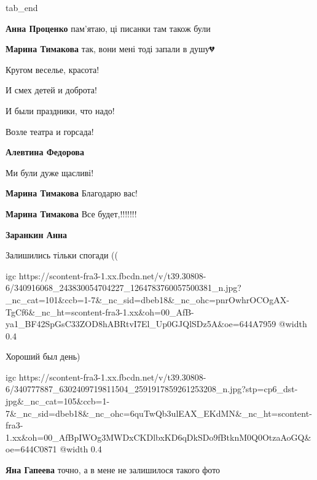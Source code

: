   tab_end
\fi

\begin{itemize} %
\textbf{Анна Проценко} пам'ятаю, ці писанки там також були

\textbf{Марина Тимакова} так, вони мені тоді запали в душу💔
\end{itemize} %


Кругом веселье, красота!

И смех детей и доброта!

И были праздники, что надо!

Возле театра и горсада!

\begin{itemize} %
\textbf{Алевтина Федорова}

Ми були дуже щасливі!

\textbf{Марина Тимакова} Благодарю вас!

\textbf{Марина Тимакова} Все будет,!!!!!!!

\textbf{Заранкин Анна} 🙏🏻
\end{itemize} %


Залишились тільки спогади ((

\ifcmt
  igc https://scontent-fra3-1.xx.fbcdn.net/v/t39.30808-6/340916068_243830054704227_1264783760057500381_n.jpg?_nc_cat=101&ccb=1-7&_nc_sid=dbeb18&_nc_ohc=pnrOwhrOCOgAX-TgCf6&_nc_ht=scontent-fra3-1.xx&oh=00_AfB-ya1_BF42SpGsC33ZOD8hABRtvI7El_Up0GJQlSDz5A&oe=644A7959
	@width 0.4
\fi


Хороший был день)


\ifcmt
  igc https://scontent-fra3-1.xx.fbcdn.net/v/t39.30808-6/340777887_6302409719811504_2591917859261253208_n.jpg?stp=cp6_dst-jpg&_nc_cat=105&ccb=1-7&_nc_sid=dbeb18&_nc_ohc=6quTwQb3ulEAX_EKdMN&_nc_ht=scontent-fra3-1.xx&oh=00_AfBpIWOg3MWDxCKDlbxKD6qDkSDo9fBtknM0Q0OtzaAoGQ&oe=644C0871
	@width 0.4
\fi

\begin{itemize} %
\textbf{Яна Гапеева} точно, а в мене не залишилося такого фото
\end{itemize} %


